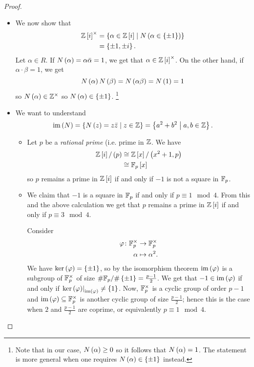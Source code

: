 \documentclass[11pt]{article}
\begin{document}
\begin{proof}
\begin{itemize}
\item
We now show that
\begin{align*}
\mbb{Z}\brs{i}^\times &= \set{\alpha \in \mbb{Z}\brs{i}}{N\prs{\alpha \in \set{\pm 1}}}
\\&= \set{\pm 1, \pm i} \text{.}
\end{align*}
Let $\alpha \in R$. If $N\left( \alpha \right) = \alpha \bar{\alpha} = 1$, we get that $\alpha \in \mathbb{Z}\left[ i \right]^\times$. On the other hand, if $\alpha \cdot \beta = 1$, we get \[N\left( \alpha \right) N\left( \beta \right) = N\left( \alpha \beta \right) = N\left( 1 \right) = 1\]
so $N\left( \alpha \right) \in \mathbb{Z}^\times$ so $N\prs{\alpha} \in \set{\pm 1}$. \footnote{Note that in our case, $N\left( \alpha \right) \geq 0$ so it follows that $N\left( \alpha \right) = 1$. The statement is more general when one requires $N\prs{\alpha} \in \set{\pm 1}$ instead.}

\item We want to understand
\[\im\prs{N} = \set{N\prs{z} = z \bar{z}}{z \in \mbb{Z}} = \set{a^2 + b^2}{a,b \in \mbb{Z}} \text{.}\]

\begin{itemize}
\item Let $p$ be a \emph{rational prime} (i.e. prime in $\mathbb{Z}$. 
We have
\begin{align*}
\mathbb{Z}\left[ i \right] / \left( p \right) &\cong \mathbb{Z}\left[ x \right] / \left( x^2 + 1, p \right)
\\&\cong \mathbb{F}_p\left[ x \right]
\end{align*}
so $p$ remains a prime in $\mathbb{Z}\left[ i \right]$ if and only if $-1$ is not a square in $\mathbb{F}_p$.

\item We claim that $-1$ is a square in $\mathbb{F}_p$ if and only if $p \equiv 1 \mod{4}$. From this and the above calculation we get that $p$ remains a prime in $\mathbb{Z}\left[ i \right]$ if and only if $p \equiv 3 \mod{4}$.

Consider
\begin{align*}
\varphi \colon \mathbb{F}_p^\times &\to \mathbb{F}_p^\times \\
\alpha &\mapsto \alpha^2 \text{.}
\end{align*}
We have $\ker\prs{\varphi} = \set{\pm 1}$, so by the isomorphism theorem $\operatorname{im}\left( \varphi \right)$ is a subgroup of $\mathbb{F}_p^\times$ of size $\#\mbb{F}_p / \#\set{\pm 1} = \frac{p-1}{2}$.
We get that $-1 \in \operatorname{im}\left( \varphi \right)$ if and only if $\left. \ker\prs{\varphi} \right|_{\im\prs{\varphi}} \neq \set{1}$.
Now, $\mathbb{F}_p^\times$ is a cyclic group of order $p-1$ and $\operatorname{im}\left( \varphi \right) \subseteq \mathbb{F}_p^\times$ is another cyclic group of size $\frac{p-1}{2}$; hence this is the case when $2$ and $\frac{p-1}{2}$ are coprime, or equivalently $p \equiv 1 \mod{4}$.


\end{itemize}
\end{itemize}
\end{proof}
\end{document}
